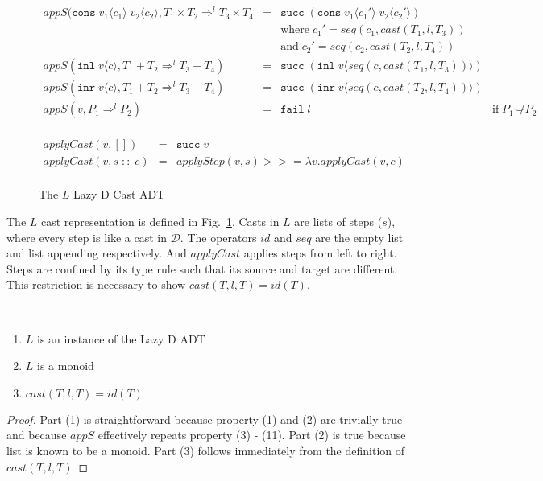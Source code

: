\documentclass[acmsmall,review,anonymous]{acmart}\settopmatter{printfolios=true,printccs=false,printacmref=false}
\newcommand{\figref}[1]{Fig.~\ref{#1}}
\newcommand{\funrule}[3]{#1 &=& #2 & #3\\}
\newcommand{\plus}[0]{+}
\newcommand{\POOprod}[2]{#1 \times #2}
\newcommand{\POOsum}[2]{#1 \plus #2}
\newcommand{\cOOcast}[3]{#1 \Rightarrow^{#2} #3}
\newcommand{\rOOsucc}[1]{\mathtt{succ}\;#1}
\newcommand{\rOOfail}[1]{\mathtt{fail}\;#1}
\newcommand{\hcvOOcons}[4]{\mathtt{cons}\;#1\langle#2\rangle\;#3\langle#4\rangle}
\newcommand{\hcvOOinl}[2]{\mathtt{inl}\;#1\langle#2\rangle}
\newcommand{\hcvOOinr}[2]{\mathtt{inr}\;#1\langle#2\rangle}
\newcommand{\sidecond}[1]{\text{if}\;#1}
\newcommand{\ineffCEKD}{\ensuremath{\mathcal{D}}}
\newcommand{\lsOOcast}[3]{\cOOcast{#1}{#2}{#3}}
\newcommand{\lcOOnull}[0]{[]}
\newcommand{\lcOOcons}[2]{#1 \; :: \; #2}
\begin{document}
\begin{figure}
\[\begin{array}{rclr}
\funrule{
  appS(
    \hcvOOcons{v_1}{c_1}{v_2}{c_2},
    \lsOOcast{\POOprod{T_1}{T_2}}{l}{\POOprod{T_3}{T_4}}
}{
  \rOOsucc{(\hcvOOcons{v_1}{c_1'}{v_2}{c_2'})}
}{
\\ &&
\text{where} \;
c_1' = seq(c_1,cast(T_1,l,T_3))
\\ &&
\text{and} \;
c_2' = seq(c_2,cast(T_2,l,T_4))
}
\funrule{
  appS(\hcvOOinl{v}{c},\lsOOcast{\POOsum{T_1}{T_2}}{l}{\POOsum{T_3}{T_4}})
}{
  \rOOsucc{(\hcvOOinl{v}{seq(c,cast(T_1,l,T_3))})}
}{}
\funrule{
  appS(\hcvOOinr{v}{c},\lsOOcast{\POOsum{T_1}{T_2}}{l}{\POOsum{T_3}{T_4}})
}{
  \rOOsucc{(\hcvOOinr{v}{seq(c,cast(T_2,l,T_4))})}
}{}
\funrule{
  appS(v,\cOOcast{P_1}{l}{P_2})
}{
  \rOOfail{l}
}{\sidecond{P_1 \not\smile P_2}}

\end{array}
\]


\[
\begin{array}{rclr}
\funrule{
  applyCast(v,\lcOOnull)
}{
  \rOOsucc{v}
}{}
\funrule{
  applyCast(v,\lcOOcons{s}{c})
}{
  applyStep(v,s) >>= \lambda v. applyCast(v,c)
}{}
\end{array}
\]

\caption{The $L$ Lazy D Cast ADT}
\label{fig:L-instance-LazyD}
\end{figure}

The $L$ cast representation is defined in \figref{fig:L-instance-LazyD}.
Casts in $L$ are lists of steps ($s$), where every step is like a cast in 
\ineffCEKD. The operators $id$ and $seq$ are the empty list and list appending 
respectively. And $applyCast$ applies steps from left to right. Steps are 
confined by its type rule such that its source and target are different. This 
restriction is necessary to show $cast(T,l,T) = id(T)$.

\begin{proposition}[$L$ Properties]\label{thm:L-LazyD-monoid}\ 
  \begin{enumerate}
  \item $L$ is an instance of the Lazy D ADT
  \item $L$ is a monoid
  \item $cast(T,l,T) = id(T)$
  \end{enumerate}
\end{proposition}
\begin{proof}
  Part (1) is straightforward because property (1) and (2) are 
  trivially true and because $appS$ effectively repeats property (3) - 
  (11).
  Part (2) is true because list is known to be a monoid.
  Part (3) follows immediately from the definition of $cast(T,l,T)$
\end{proof}
\end{document}
